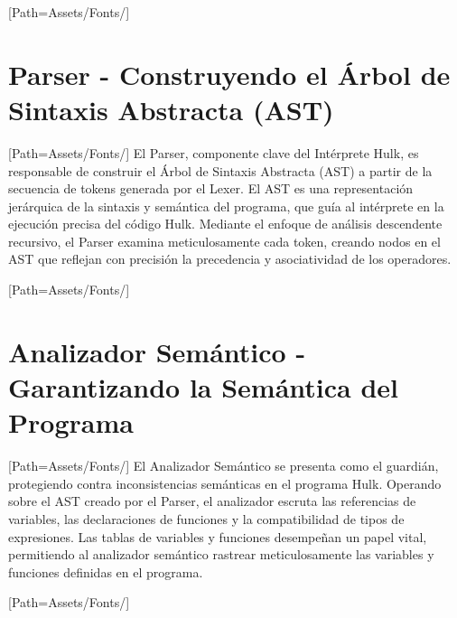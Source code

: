 \documentclass{article}
\begin{document}
\setmainfont{LEMONMILK-Bold.otf}[Path=Assets/Fonts/]
\section{Parser - Construyendo el Árbol de Sintaxis Abstracta (AST)}
    \setmainfont{LEMONMILK-Regular.otf}[Path=Assets/Fonts/]
    El Parser, componente clave del Intérprete Hulk, es responsable de construir el Árbol de Sintaxis Abstracta (AST) a partir de la secuencia de tokens generada por el Lexer. El AST es una representación jerárquica de la sintaxis y semántica del programa, que guía al intérprete en la ejecución precisa del código Hulk. Mediante el enfoque de análisis descendente recursivo, el Parser examina meticulosamente cada token, creando nodos en el AST que reflejan con precisión la precedencia y asociatividad de los operadores.
\newpage

\setmainfont{LEMONMILK-Bold.otf}[Path=Assets/Fonts/]
\section{Analizador Semántico - Garantizando la Semántica del Programa}
    \setmainfont{LEMONMILK-Regular.otf}[Path=Assets/Fonts/]
    El Analizador Semántico se presenta como el guardián, protegiendo contra inconsistencias semánticas en el programa Hulk. Operando sobre el AST creado por el Parser, el analizador escruta las referencias de variables, las declaraciones de funciones y la compatibilidad de tipos de expresiones. Las tablas de variables y funciones desempeñan un papel vital, permitiendo al analizador semántico rastrear meticulosamente las variables y funciones definidas en el programa.
\newpage

\setmainfont{LEMONMILK-Bold.otf}[Path=Assets/Fonts/]
\end{document}
